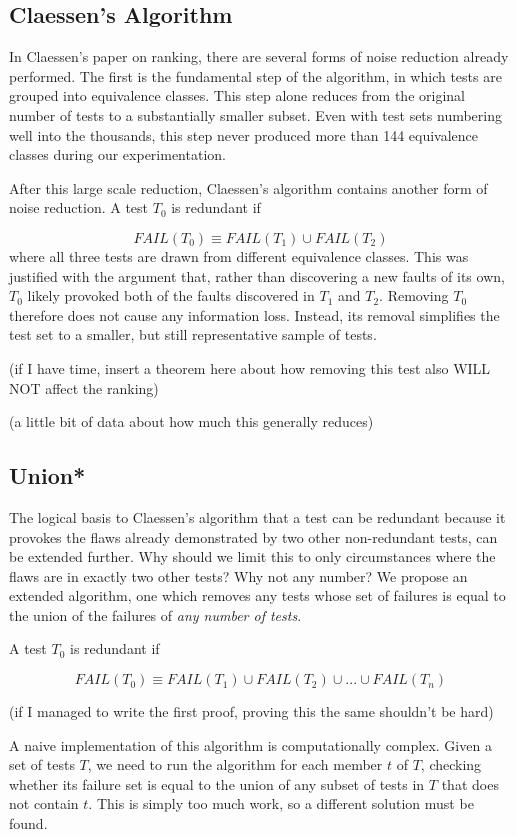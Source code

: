 \documentclass[11pt]{article}
\begin{document}
\subsection*{Claessen's Algorithm}
In Claessen's paper on ranking, there are several forms of noise reduction already performed. The first is the fundamental step of the algorithm, in which tests are grouped into equivalence classes. This step alone reduces from the original number of tests to a substantially smaller subset. Even with test sets numbering well into the thousands, this step never produced more than 144 equivalence classes during our experimentation.

After this large scale reduction, Claessen's algorithm contains another form of noise reduction. A test $T_0$ is redundant if

$$FAIL (T_0) \equiv FAIL(T_1) \cup FAIL(T_2)$$
where all three tests are drawn from different equivalence classes. This was justified with the argument that, rather than discovering a new faults of its own, $T_0$ likely provoked both of the faults discovered in $T_1$ and $T_2$. Removing $T_0$ therefore does not cause any information loss. Instead, its removal simplifies the test set to a smaller, but still representative sample of tests.

(if I have time, insert a theorem here about how removing this test also WILL NOT affect the ranking)

(a little bit of data about how much this generally reduces)

\subsection*{Union*}
The logical basis to Claessen's algorithm that a test can be redundant because it provokes the flaws already demonstrated by two other non-redundant tests\cite{Claessen}, can be extended further. Why should we limit this to only circumstances where the flaws are in exactly two other tests? Why not any number? We propose an extended algorithm, one which removes any tests whose set of failures is equal to the union of the failures of \emph{any number of tests}. 

A test $T_0$ is redundant if

$$FAIL (T_0) \equiv FAIL(T_1) \cup FAIL(T_2) \cup ... \cup FAIL(T_n) $$

(if I managed to write the first proof, proving this the same shouldn't be hard)

A naive implementation of this algorithm is computationally complex. Given a set of tests $T$, we need to run the algorithm for each member $t$ of $T$, checking whether its failure set is equal to the union of any subset of tests in $T$ that does not contain $t$. This is simply too much work, so a different solution must be found.
\end{document}
